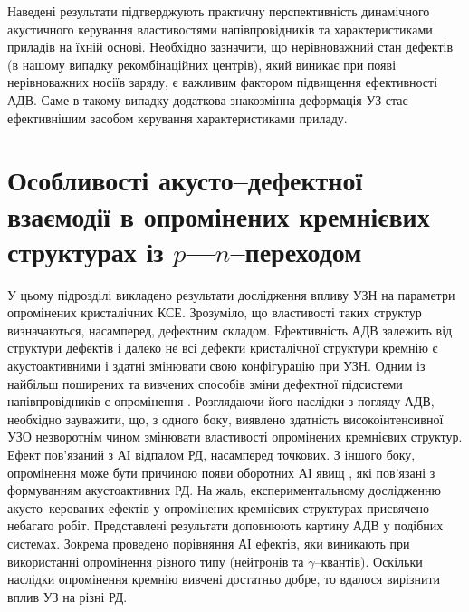 Наведені результати підтверджують практичну перспективність динамічного акустичного керування властивостями напівпровідників та характеристиками приладів на їхній основі.
Необхідно зазначити, що нерівноважний стан дефектів (в нашому випадку рекомбінаційних центрів), який виникає при появі нерівноважних носіїв заряду,
є важливим фактором підвищення ефективності АДВ.
Саме в такому випадку додаткова знакозмінна деформація УЗ стає ефективнішим засобом керування характеристиками приладу.



\section{Особливості акусто--дефектної взаємодії в опромінених кремнієвих структурах із $p$---$n$--переходом\label{Rad_SSC}}
У цьому підрозділі викладено результати дослідження впливу УЗН на параметри опромінених кристалічних КСЕ.
Зрозуміло, що властивості таких структур визначаються, насамперед, дефектним складом.
Ефективність АДВ залежить від структури дефектів \cite{UST:Medvid} і
далеко не всі дефекти кристалічної структури кремнію є акустоактивними і здатні змінювати свою конфігурацію при УЗН.
Одним із найбільш поширених та вивчених способів зміни дефектної підсистеми напівпровідників є опромінення \cite{Kozlovs,DefImplan}.
Розглядаючи його наслідки з погляду АДВ, необхідно зауважити, що, з одного боку, виявлено \cite{YOlikh2007TPLr,Parchinskii2006r,Gorb2010,Podolian2012r} здатність високоінтенсивної УЗО незворотнім чином змінювати властивості опромінених кремнієвих структур.
Ефект пов'язаний з АІ відпалом РД, насамперед точкових.
З іншого боку, опромінення може бути причиною появи оборотних АІ явищ \cite{YOlikh2006TPLr,YOlikhTPL2011r},
які пов'язані з формуванням акустоактивних РД.
На жаль, експериментальному  дослідженню акусто--керованих ефектів у опромінених кремнієвих структурах присвячено небагато робіт.
Представлені результати доповнюють картину АДВ у подібних системах.
Зокрема проведено порівняння АІ ефектів, яки виникають при використанні опромінення різного типу (нейтронів та $\gamma$--квантів).
Оскільки наслідки опромінення кремнію вивчені достатньо добре, то вдалося  вирізнити
вплив УЗ на різні РД.

